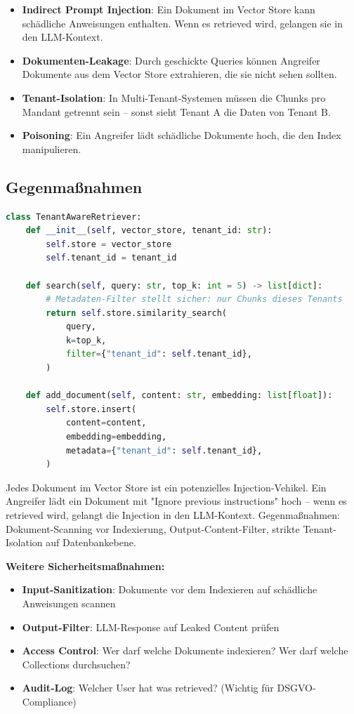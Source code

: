 \begin{itemize}[leftmargin=*]
    \item \textbf{Indirect Prompt Injection}: Ein Dokument im Vector Store kann schädliche Anweisungen enthalten. Wenn es retrieved wird, gelangen sie in den LLM-Kontext.
    \item \textbf{Dokumenten-Leakage}: Durch geschickte Queries können Angreifer Dokumente aus dem Vector Store extrahieren, die sie nicht sehen sollten.
    \item \textbf{Tenant-Isolation}: In Multi-Tenant-Systemen müssen die Chunks pro Mandant getrennt sein -- sonst sieht Tenant A die Daten von Tenant B.
    \item \textbf{Poisoning}: Ein Angreifer lädt schädliche Dokumente hoch, die den Index manipulieren.
\end{itemize}

\subsection{Gegenmaßnahmen}

\begin{lstlisting}[language=Python, caption=Tenant-Isolation in RAG]
class TenantAwareRetriever:
    def __init__(self, vector_store, tenant_id: str):
        self.store = vector_store
        self.tenant_id = tenant_id

    def search(self, query: str, top_k: int = 5) -> list[dict]:
        # Metadaten-Filter stellt sicher: nur Chunks dieses Tenants
        return self.store.similarity_search(
            query,
            k=top_k,
            filter={"tenant_id": self.tenant_id},
        )

    def add_document(self, content: str, embedding: list[float]):
        self.store.insert(
            content=content,
            embedding=embedding,
            metadata={"tenant_id": self.tenant_id},
        )
\end{lstlisting}

\begin{praxishinweis}
Jedes Dokument im Vector Store ist ein potenzielles Injection-Vehikel. Ein Angreifer lädt ein Dokument mit "Ignore previous instructions" hoch -- wenn es retrieved wird, gelangt die Injection in den LLM-Kontext. Gegenmaßnahmen: Dokument-Scanning vor Indexierung, Output-Content-Filter, strikte Tenant-Isolation auf Datenbankebene.
\end{praxishinweis}

\textbf{Weitere Sicherheitsmaßnahmen:}
\begin{itemize}[leftmargin=*]
    \item \textbf{Input-Sanitization}: Dokumente vor dem Indexieren auf schädliche Anweisungen scannen
    \item \textbf{Output-Filter}: LLM-Response auf Leaked Content prüfen
    \item \textbf{Access Control}: Wer darf welche Dokumente indexieren? Wer darf welche Collections durchsuchen?
    \item \textbf{Audit-Log}: Welcher User hat was retrieved? (Wichtig für DSGVO-Compliance)
\end{itemize}

